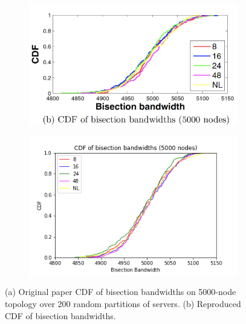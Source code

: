 \begin{figure}[t]
\begin{subfigure}[b]{0.5\textwidth}
\centering
   \includegraphics[width=0.95\linewidth]{figures/bisections_original}
   \caption{}
   \label{fig:Ng1} 
\end{subfigure}

\begin{subfigure}[b]{0.5\textwidth}
\centering
   \includegraphics[width=0.95\linewidth]{figures/bisections}
   \caption{}
   \label{fig:Ng2}
\end{subfigure}

\caption{(a) Original paper CDF of bisection bandwidths on 5000-node topology over 200 random partitions of servers. (b) Reproduced CDF of bisection bandwidths.}
\end{figure}

